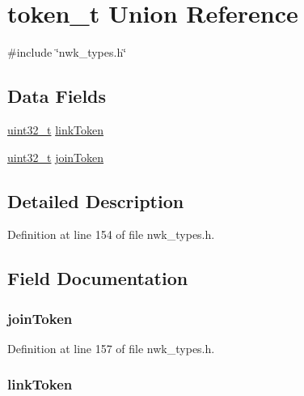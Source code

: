 \hypertarget{uniontoken__t}{\section{token\-\_\-t \-Union \-Reference}
\label{uniontoken__t}
}


{\ttfamily \#include \char`\"{}nwk\-\_\-types.\-h\char`\"{}}

\subsection*{\-Data \-Fields}
\begin{DoxyCompactItemize}
\item 
\hyperlink{bsp__msp430__defs_8h_a06896e8c53f721507066c079052171f8}{uint32\-\_\-t} \hyperlink{uniontoken__t_a3e14395c76be7424b9c4ec8a64f90980}{link\-Token}
\item 
\hyperlink{bsp__msp430__defs_8h_a06896e8c53f721507066c079052171f8}{uint32\-\_\-t} \hyperlink{uniontoken__t_ab456f80b5caa7e3f65f9f51efbb021eb}{join\-Token}
\end{DoxyCompactItemize}


\subsection{\-Detailed \-Description}


\-Definition at line 154 of file nwk\-\_\-types.\-h.



\subsection{\-Field \-Documentation}
\hypertarget{uniontoken__t_ab456f80b5caa7e3f65f9f51efbb021eb}{
\subsubsection[{join\-Token}]{ {\bf join\-Token}}}\label{uniontoken__t_ab456f80b5caa7e3f65f9f51efbb021eb}


\-Definition at line 157 of file nwk\-\_\-types.\-h.

\hypertarget{uniontoken__t_a3e14395c76be7424b9c4ec8a64f90980}{
\subsubsection[{link\-Token}]{ {\bf link\-Token}}}\label{uniontoken__t_a3e14395c76be7424b9c4ec8a64f90980}


